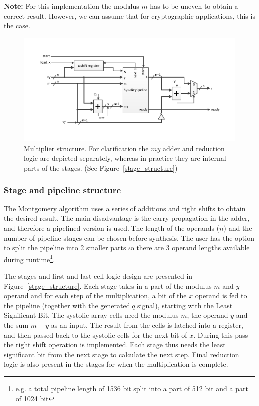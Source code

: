 \textbf{Note:} For this implementation the modulus $m$ has to be uneven to obtain a correct result. However, we can assume that for cryptographic applications, this is the case.


\begin{figure}[H] 
\centering 
\includegraphics[trim=1.2cm 1.2cm 1.2cm 1.2cm, width=15cm]{pictures/mult_structure.pdf}
\caption{Multiplier structure. For clarification the $my$ adder and reduction logic are depicted separately, whereas in practice they are internal parts of the stages. (See Figure~\ref{stage_structure})}
\label{mult_structure}
\end{figure}

\subsubsection{Stage and pipeline structure}
The Montgomery algorithm uses a series of additions and right shifts to obtain the desired result. The main disadvantage is the carry propagation in the adder, and therefore a pipelined version is used. The length of the operands ($n$) and the number of pipeline stages can be chosen before synthesis. The user has the option to split the pipeline into 2 smaller parts so there are 3 operand lengths available during runtime\footnote{e.g. a total pipeline length of 1536 bit split into a part of 512 bit and a part of 1024 bit}.

The stages and first and last cell logic design are presented in Figure~\ref{stage_structure}. Each stage takes in a part of the modulus $m$ and $y$ operand and for each step of the multiplication, a bit of the $x$ operand is fed to the pipeline (together with the generated $q$ signal), starting with the Least Significant Bit. The systolic array cells need the modulus $m$, the operand $y$ and the sum $m+y$ as an input. The result from the cells is latched into a register, and then passed back to the systolic cells for the next bit of $x$. During this pass the right shift operation is
implemented. Each stage thus needs the least significant bit from the next stage to calculate the next step. Final reduction logic is also present in the stages for when the multiplication is complete.

